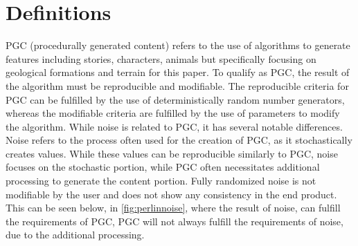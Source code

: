 \documentclass[10pt]{report}
\begin{document}
		\section{Definitions}
		PGC (procedurally generated content) refers to the use of algorithms to generate features including stories, characters, animals but specifically focusing on geological formations and terrain for this paper. To qualify as PGC, the result of the algorithm must be reproducible and modifiable. The reproducible criteria for PGC can be fulfilled by the use of deterministically random number generators, whereas the modifiable criteria are fulfilled by the use of parameters to modify the algorithm. While noise is related to PGC, it has several notable differences. Noise refers to the process often used for the creation of PGC, as it stochastically creates values. While these values can be reproducible similarly to PGC, noise focuses on the stochastic portion, while PGC often necessitates additional processing to generate the content portion. Fully randomized noise is not modifiable by the user and does not show any consistency in the end product. This can be seen below, in \autoref{fig:perlinnoise}, where the result of noise, can fulfill the requirements of PGC, PGC will not always fulfill the requirements of noise, due to the additional processing. 
		
\end{document}
